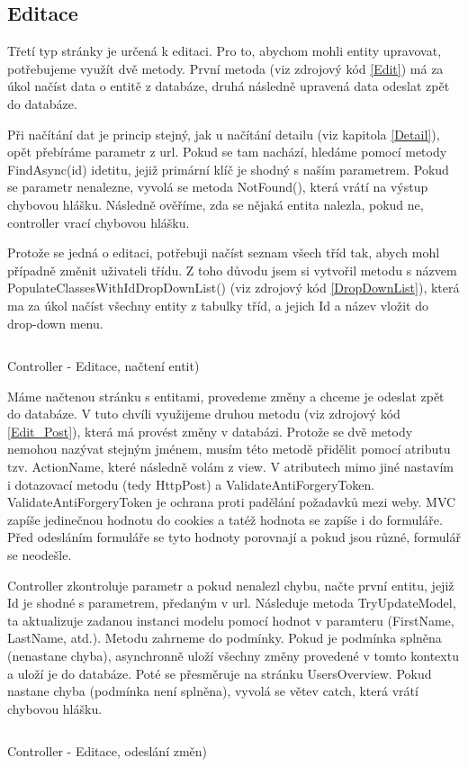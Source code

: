 \documentclass[a4paper, 12pt]{report}
\begin{document}
	\subsection{Editace}
	Třetí typ stránky je určená k editaci. Pro to, abychom mohli entity upravovat, potřebujeme využít dvě metody. První metoda (viz zdrojový kód \ref{Edit}) má za úkol načíst data o entitě z databáze, druhá následně upravená data odeslat zpět do databáze.\par
	Při načítání dat je princip stejný, jak u načítání detailu (viz kapitola \ref{Detail}), opět přebíráme parametr z url. Pokud se tam nachází, hledáme pomocí metody FindAsync(id) idetitu, jejiž primární klíč je shodný s naším parametrem. Pokud se parametr nenalezne, vyvolá se metoda NotFound(), která vrátí na výstup chybovou hlášku. Následně ověříme, zda se nějaká entita nalezla, pokud ne, controller vrací chybovou hlášku.\par
	Protože se jedná o editaci, potřebuji načíst seznam všech tříd tak, abych mohl případně změnit uživateli třídu. Z toho důvodu jsem si vytvořil metodu s názvem PopulateClassesWithIdDropDownList() (viz zdrojový kód \ref{DropDownList}), která ma za úkol načíst všechny entity z tabulky tříd, a jejich Id a název vložit do drop-down menu.
	\begin{listing}[H]
	\inputminted{csharp}{SourceCode/Controllers/Edit.cs}
	\caption{Controller - Editace, načtení entit)}
	\label{Edit}
	\end{listing}
	Máme načtenou stránku s entitami, provedeme změny a chceme je odeslat zpět do databáze. V tuto chvíli využijeme druhou metodu (viz zdrojový kód \ref{Edit_Post}), která má provést změny v databázi. Protože se dvě metody nemohou nazývat stejným jménem, musím této metodě přidělit pomocí atributu tzv. ActionName, které následně volám z view. V atributech mimo jiné nastavím i dotazovací metodu (tedy HttpPost) a ValidateAntiForgeryToken. ValidateAntiForgeryToken je ochrana proti padělání požadavků mezi weby. MVC zapíše jedinečnou hodnotu do cookies a tatéž hodnota se zapíše i do formuláře. Před odesláním formuláře se tyto hodnoty porovnají a pokud jsou různé, formulář se neodešle.\par
	Controller zkontroluje parametr a pokud nenalezl chybu, načte první entitu, jejiž Id je shodné s parametrem, předaným v url. Následuje metoda TryUpdateModel, ta aktualizuje zadanou instanci modelu pomocí hodnot v paramteru (FirstName, LastName, atd.). Metodu zahrneme do podmínky. Pokud je podmínka splněna (nenastane chyba), asynchronně uloží všechny změny provedené v tomto kontextu a uloží je do databáze. Poté se přesměruje na stránku UsersOverview. Pokud nastane chyba (podmínka není splněna), vyvolá se větev catch, která vrátí chybovou hlášku.
	\begin{listing}[H]
	\inputminted{csharp}{SourceCode/Controllers/Edit_Post.cs}
	\caption{Controller - Editace, odeslání změn)}
	\label{Edit_Post}
	\end{listing}
\end{document}
